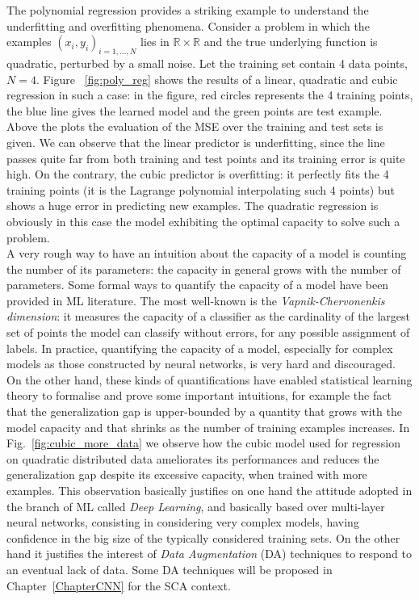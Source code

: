 The polynomial regression provides a striking example to understand the underfitting and overfitting phenomena. Consider a problem in which the examples $(x_i,y_i)_{i=1,\dots,N}$ lies in $\mathbb{R} \times \mathbb{R}$ and the true underlying function is quadratic, perturbed by a small noise. Let the training set contain 4 data points, \ie $N=4$. Figure ~\ref{fig:poly_reg} shows the results of a linear, quadratic and cubic regression in such a case: in the figure, red circles represents the 4 training points, the blue line gives the learned model and the green points are test example. Above the plots the evaluation of the MSE over the training and test sets is given. We can observe that the linear predictor is underfitting, since the line passes quite far from both training and test points and its training error is quite high. On the contrary, the cubic predictor is overfitting: it perfectly fits the 4 training points (it is the Lagrange polynomial interpolating such 4 points) but shows a huge error in predicting new examples. The quadratic regression is obviously in this case the model exhibiting the optimal capacity to solve such a problem. \\

A very rough way to have an intuition about the capacity of a model is counting the number of its parameters: the capacity in general grows with the number of parameters. Some formal ways to quantify the capacity of a model have been provided in ML literature. The most well-known is the \emph{Vapnik-Chervonenkis dimension}: it measures the capacity of a classifier as the cardinality of the largest set of points the model can classify without errors, for any possible assignment of labels. In practice, quantifying the capacity of a model, especially for complex models as those constructed by neural networks, is very hard and discouraged. On the other hand, these kinds of quantifications have enabled statistical learning theory to formalise and prove some important intuitions, for example the fact that the generalization gap is upper-bounded by a quantity that grows with the model capacity and that shrinks as the number of training examples increases. In Fig.~\ref{fig:cubic_more_data} we observe how the cubic model used for regression on quadratic distributed data ameliorates its performances and reduces the generalization gap despite its excessive capacity, when trained with more examples. This observation basically justifies on one hand the attitude adopted in the branch of ML called \emph{Deep Learning}, and basically based over multi-layer neural networks, consisting in considering very complex models, having confidence in the big size of the typically considered training sets. On the other hand it justifies the interest of \emph{Data Augmentation} (DA) techniques to respond to an eventual lack of data. Some DA techniques will be proposed in Chapter~\ref{ChapterCNN} for the SCA context.

